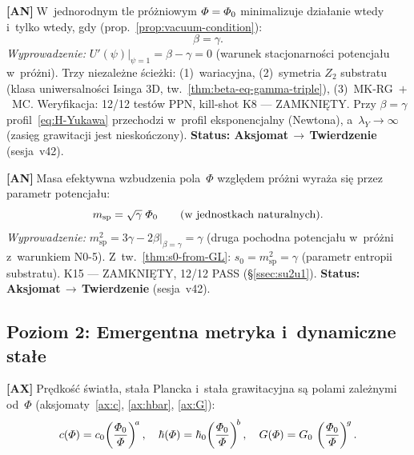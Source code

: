\begin{chain}[A7 --- Warunek pr\'o\.zniowy N0-5: $\beta = \gamma$]\label{chain:A7}
  \textbf{[AN]}$\;$W~jednorodnym tle pr\'o\.zniowym
  $\varPhi = \varPhi_0$ minimalizuje dzia\l{}anie wtedy i~tylko wtedy,
  gdy (prop.~\ref{prop:vacuum-condition}):
  \begin{equation}\label{eq:H-vac}
    \beta = \gamma.
  \end{equation}
  \emph{Wyprowadzenie:} $U'(\psi)\big|_{\psi=1} = \beta - \gamma = 0$
  (warunek stacjonarno\'sci potencja\l{}u w~pr\'o\.zni).
  Trzy niezale\.zne \'scie\.zki: (1)~wariacyjna, (2)~symetria $Z_2$
  substratu (klasa uniwersalno\'sci Isinga 3D,
  tw.~\ref{thm:beta-eq-gamma-triple}), (3)~MK-RG~$+$~MC.
  Weryfikacja: 12/12 test\'ow PPN, kill-shot K8 --- ZAMKNI\k{E}TY.
  Przy $\beta = \gamma$ profil~\eqref{eq:H-Yukawa} przechodzi
  w~profil eksponencjalny (Newtona), a~$\lambda_Y \to \infty$
  (zasi\k{e}g grawitacji jest niesko\'nczony).
  \textbf{Status: Aksjomat\,$\to$\,Twierdzenie} (sesja~v42).
\end{chain}

\begin{chain}[A8 --- Masa substratu N0-6: $m_{\mathrm{sp}} = \sqrt{\gamma}$]%
  \label{chain:A8}
  \textbf{[AN]}$\;$Masa efektywna wzbudzenia pola~$\Phi$
  wzgl\k{e}dem pr\'o\.zni wyra\.za si\k{e} przez parametr potencja\l{}u:
  \begin{equation}\label{eq:H-msp}
    m_{\mathrm{sp}} = \sqrt{\gamma}\;\varPhi_0
    \qquad (\text{w~jednostkach naturalnych}).
  \end{equation}
  \emph{Wyprowadzenie:} $m_{\mathrm{sp}}^2 = 3\gamma - 2\beta
  \big|_{\beta=\gamma} = \gamma$
  (druga pochodna potencja\l{}u w~pr\'o\.zni z~warunkiem N0-5).
  Z~tw.~\ref{thm:s0-from-GL}: $s_0 = m_{\mathrm{sp}}^2 = \gamma$
  (parametr entropii substratu).
  K15 --- ZAMKNI\k{E}TY, 12/12 PASS (\S\ref{ssec:su2u1}).
  \textbf{Status: Aksjomat\,$\to$\,Twierdzenie} (sesja~v42).
\end{chain}

\subsection{Poziom 2: Emergentna metryka i~dynamiczne sta\l{}e}%
\label{app:H-metryka}

\begin{chain}\label{chain:A9}
  \textbf{[AX]}$\;$Pr\k{e}dko\'s\'c \'swiat\l{}a, sta\l{}a Plancka
  i~sta\l{}a grawitacyjna s\k{a} polami zale\.znymi od~$\Phi$
  (aksjomaty~\ref{ax:c}, \ref{ax:hbar}, \ref{ax:G}):
  \begin{equation}\label{eq:H-stale}
    c(\varPhi) = c_0\!\left(\frac{\varPhi_0}{\varPhi}\right)^{\!a},\quad
    \hbar(\varPhi) = \hbar_0\!\left(\frac{\varPhi_0}{\varPhi}\right)^{\!b},\quad
    G(\varPhi) = G_0\,\left(\frac{\varPhi_0}{\varPhi}\right)^{\!g}.
  \end{equation}
\end{chain}

